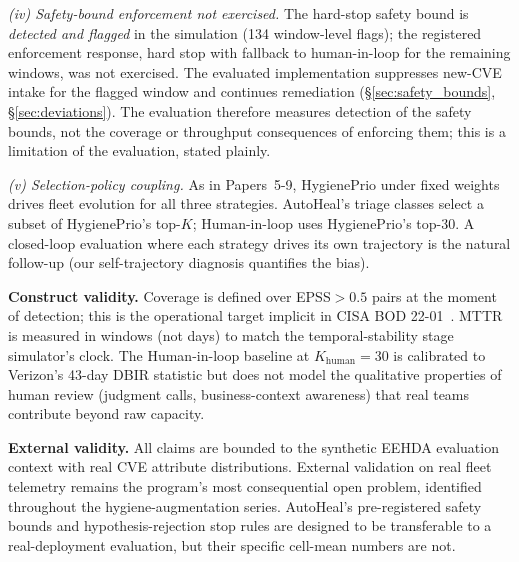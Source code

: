 \textit{(iv) Safety-bound enforcement not exercised.} The
hard-stop safety bound is \emph{detected and flagged} in the
simulation (134 window-level flags); the registered enforcement
response, hard stop with fallback to human-in-loop for the
remaining windows, was not exercised. The evaluated
implementation suppresses new-CVE intake for the flagged window
and continues remediation (\S\ref{sec:safety_bounds},
\S\ref{sec:deviations}). The evaluation therefore measures
detection of the safety bounds, not the coverage or throughput
consequences of enforcing them; this is a limitation of the
evaluation, stated plainly.

\textit{(v) Selection-policy coupling.} As in Papers~5-9,
HygienePrio under fixed weights drives fleet evolution for all
three strategies. AutoHeal's triage classes select a subset of
HygienePrio's top-$K$; Human-in-loop uses HygienePrio's top-30.
A closed-loop evaluation where each strategy drives its own
trajectory is the natural follow-up (our self-trajectory diagnosis
quantifies the bias).

\textbf{Construct validity.} Coverage is defined over EPSS$>0.5$
pairs at the moment of detection; this is the operational target
implicit in CISA BOD 22-01~\cite{cisa2021bod2201}. MTTR is
measured in windows (not days) to match the temporal-stability stage
simulator's
clock. The Human-in-loop baseline at $K_{\text{human}} = 30$ is
calibrated to Verizon's 43-day DBIR statistic but does not model
the qualitative properties of human review (judgment calls,
business-context awareness) that real teams contribute beyond
raw capacity.

\textbf{External validity.} All claims are bounded to the synthetic
EEHDA evaluation context with real CVE attribute distributions.
External validation on real fleet telemetry remains the program's
most consequential open problem, identified throughout
the hygiene-augmentation series. AutoHeal's pre-registered safety bounds and
hypothesis-rejection stop rules are designed to be transferable
to a real-deployment evaluation, but their specific cell-mean
numbers are not.

